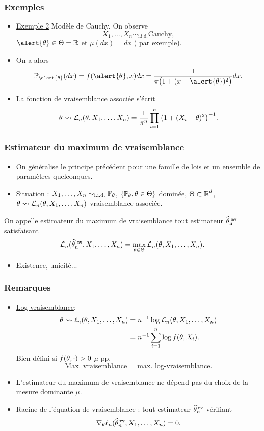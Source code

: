 \begin{frame}
\frametitle{Exemples}
\begin{itemize}
\item \underline{Exemple 2} \alert{Modèle de Cauchy}. On observe
$$X_1,\ldots, X_n \sim_{\text{i.i.d.}}\text{Cauchy},$$
$\alert{\truetheta} \in \Theta = \R$ et $\mu(dx)=dx$ (\alert{ par exemple}).
\item On a alors
$$\PP_{\alert{\truetheta}}(dx)=f(\alert{\truetheta},x)dx=\frac{1}{\pi\big(1+(x-\alert{\truetheta})^2\big)}dx.$$
\item La \alert{ fonction de vraisemblance} associée s'écrit
$$\theta \leadsto {\mathcal L}_n(\theta, X_1,\ldots, X_n) = \frac{1}{\pi^n}\prod_{i = 1}^n \big(1+(X_i-\theta)^2\big)^{-1}.$$
\end{itemize}
\end{frame}


\begin{frame}
\frametitle{Estimateur du maximum de vraisemblance}
\begin{itemize}
\item On généralise le principe précédent pour une famille de lois et un ensemble de paramètres \alert{quelconques}.
\item \underline{Situation} : $X_1,\ldots, X_n\sim_{\text{i.i.d.}}\operatorname{{\mathbb P}}_\theta$, $\{\operatorname{{\mathbb P}}_\theta,\theta \in \Theta\}$ dominée, $\Theta \subset \operatorname{{\mathbb R}}^d$, $\theta \leadsto {\mathcal L}_n(\theta, X_1,\ldots, X_n)$ vraisemblance associée.
\end{itemize}
\begin{df}
On appelle \alert{ estimateur du maximum de vraisemblance} tout estimateur $\operatorname{\widehat \theta_n^{\,\,{\tt mv}}}$ satisfaisant
$${\mathcal L}_n(\operatorname{\widehat \theta_n^{\,\,{\tt mv}}},X_1,\ldots, X_n) = \max_{\theta \in \Theta} {\mathcal L}_n(\theta, X_1,\ldots, X_n).$$
\end{df}
\begin{itemize}
\item \alert{Existence, unicité...}
\end{itemize}
\end{frame}

\begin{frame}
\frametitle{Remarques}
\begin{itemize}
\item \underline{Log-vraisemblance}:
\begin{align*}\theta \leadsto \ell_n(\theta, X_1,\ldots, X_n)& = n^{-1} \log {\mathcal L}_n(\theta, X_1,\ldots, X_n)\\
& = n^{-1} \sum_{i = 1}^n \log f(\theta, X_i).
\end{align*}
\alert{Bien défini} si $f(\theta, \cdot) >0$ $\mu$-pp.
$$\text{Max. vraisemblance = max. log-vraisemblance.}$$
\item L'estimateur du maximum de vraisemblance \alert{ ne dépend pas} du choix de la mesure dominante $\mu$.
\item \alert{Racine de l'équation de vraisemblance} : tout estimateur $\widehat {\theta}_n^{\,{\tt rv}}$ vérifiant
$$\nabla_\theta \ell_n(\widehat {\theta}_n^{\,{\tt rv}}, X_1,\ldots, X_n) = 0.$$
\end{itemize}
\end{frame}

